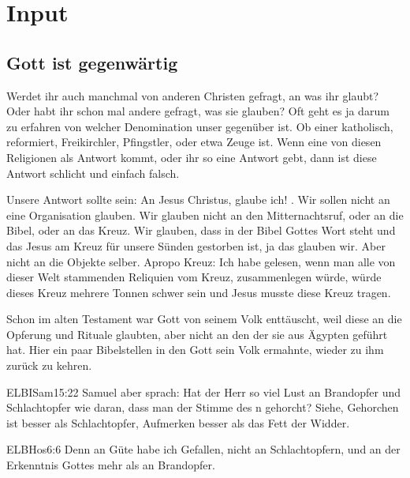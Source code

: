 \section{ Input }
\begin{spacing}{1.5}
\subsection{Gott ist gegenwärtig}
Werdet ihr auch manchmal von anderen Christen gefragt, an was ihr glaubt? Oder habt ihr schon mal andere gefragt, was sie glauben? Oft geht es ja darum zu erfahren von welcher Denomination unser gegenüber ist. Ob einer katholisch, reformiert, Freikirchler, Pfingstler, oder etwa Zeuge ist. Wenn eine von diesen Religionen als Antwort kommt, oder ihr so eine Antwort gebt, dann ist diese Antwort schlicht und einfach falsch.

Unsere Antwort sollte sein: \glqq An Jesus Christus, glaube ich! \grqq{}. Wir sollen nicht an eine Organisation glauben. Wir glauben nicht an den Mitternachtsruf, oder an die Bibel, oder an das Kreuz. Wir glauben, dass in der Bibel Gottes Wort steht und das Jesus am Kreuz für unsere Sünden gestorben ist, ja das glauben wir. Aber nicht an die Objekte selber. Apropo Kreuz: Ich habe gelesen, wenn man alle von dieser Welt stammenden Reliquien vom Kreuz, zusammenlegen würde, würde dieses Kreuz mehrere Tonnen schwer sein und Jesus musste diese Kreuz tragen.

Schon im alten Testament war Gott von seinem Volk enttäuscht, weil diese an die Opferung und Rituale glaubten, aber nicht an den \herr{} der sie aus Ägypten geführt hat. Hier ein paar Bibelstellen in den Gott sein Volk ermahnte, wieder zu ihm zurück zu kehren.
\begin{bibelbox}{ELB}{ISam}{15:22}
Samuel aber sprach: Hat der Herr so viel Lust an Brandopfer und Schlachtopfer wie daran, dass man der Stimme des \herr n gehorcht? Siehe, Gehorchen ist besser als Schlachtopfer, Aufmerken besser als das Fett der Widder.
\end{bibelbox}
\begin{bibelbox}{ELB}{Hos}{6:6}
 Denn an Güte habe ich Gefallen, nicht an Schlachtopfern, und an der Erkenntnis Gottes mehr als an Brandopfer.
\end{bibelbox}


\end{spacing}
